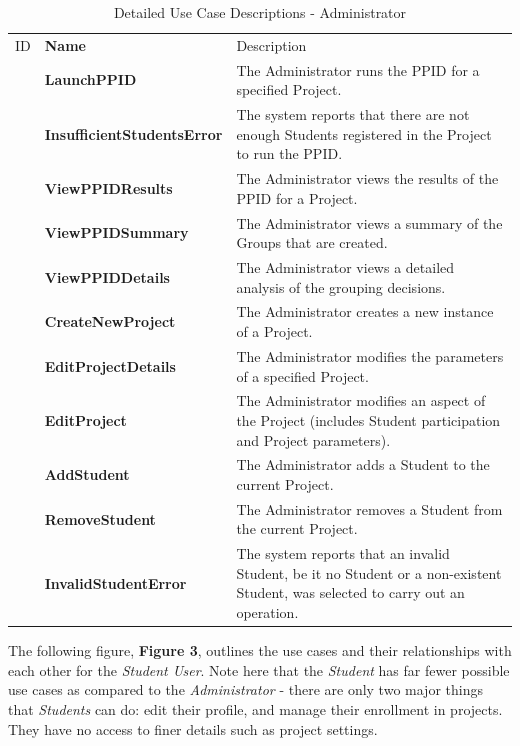 \documentclass[12pt,letterpaper]{article}
\begin{document}
\begin{table}[H]
	\caption{Detailed Use Case Descriptions - Administrator}
	\begin{tabu} to 
	    \tableheader{}ID & Name & Description\\
		\launchppid{} & LaunchPPID & The Administrator runs the PPID for a specified Project.\\
		\insufficientstudentserror{} & InsufficientStudentsError & The system reports that there are not enough Students registered in the Project to run the PPID.\\
		\viewppidresults{} & ViewPPIDResults & The Administrator views the results of the PPID for a Project.\\
		\viewppidsummary{} & ViewPPIDSummary & The Administrator views a summary of the Groups that are created.\\
		\viewppiddetails{} & ViewPPIDDetails & The Administrator views a detailed analysis of the grouping decisions.\\
		\createnewproject{} & CreateNewProject & The Administrator creates a new instance of a Project.\\
		\editprojectdetails{} & EditProjectDetails & The Administrator modifies the parameters of a specified Project.\\
		\editproject{} & EditProject & The Administrator modifies an aspect of the Project (includes Student participation and Project parameters).\\
		\addstudent{} & AddStudent & The Administrator adds a Student to the current Project.\\
		\removestudent{} & RemoveStudent & The Administrator removes a Student from the current Project.\\
		\invalidstudenterror{} & InvalidStudentError & The system reports that an invalid Student, be it no Student or a non-existent Student, 
		was selected to carry out an operation.\\
	\end{tabu}
\end{table}

The following figure, {\bf Figure 3}, outlines the use cases and their relationships with each other for the {\it Student User}. Note here that the {\it Student} has far fewer possible use cases
as compared to the {\it Administrator} - there are only two major things that {\it Students} can do: edit their profile, and manage their enrollment in projects. They have no 
access to finer details such as project settings. 
\end{document}
